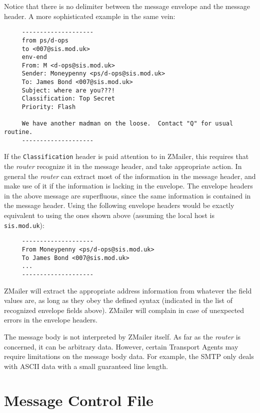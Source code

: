Notice that there is no delimiter between the message envelope and the
message header.  A more sophisticated example in the same vein:

\begin{verbatim}
     --------------------
     from ps/d-ops
     to <007@sis.mod.uk>
     env-end
     From: M <d-ops@sis.mod.uk>
     Sender: Moneypenny <ps/d-ops@sis.mod.uk>
     To: James Bond <007@sis.mod.uk>
     Subject: where are you???!
     Classification: Top Secret
     Priority: Flash
     
     We have another madman on the loose.  Contact "Q" for usual routine.
     --------------------
\end{verbatim}


If the {\tt Classification} header is paid attention to in ZMailer, this
requires that the {\em router\/} recognize it in the message header, and take
appropriate action.  In general the {\em router\/} can extract most of the
information in the message header, and make use of it if the information is
lacking in the envelope.  The envelope headers in the above message are
superfluous, since the same information is contained in the message header.
Using the following envelope headers would be exactly equivalent to using
the ones shown above (assuming the local host is {\tt sis.mod.uk}):

\begin{verbatim}
     --------------------
     From Moneypenny <ps/d-ops@sis.mod.uk>
     To James Bond <007@sis.mod.uk>
     ...
     --------------------
\end{verbatim}


ZMailer will extract the appropriate address information from whatever the
field values are, as long as they obey the defined syntax (indicated in the
list of recognized envelope fields above).  ZMailer will complain in case
of unexpected errors in the envelope headers.

The message body is not interpreted by ZMailer itself.  As far as the
{\em router\/} is concerned, it can be arbitrary data.  However, certain Transport
Agents may require limitations on the message body data. For example, the
SMTP only deals with ASCII data with a small guaranteed line length.










\section{Message Control File}

